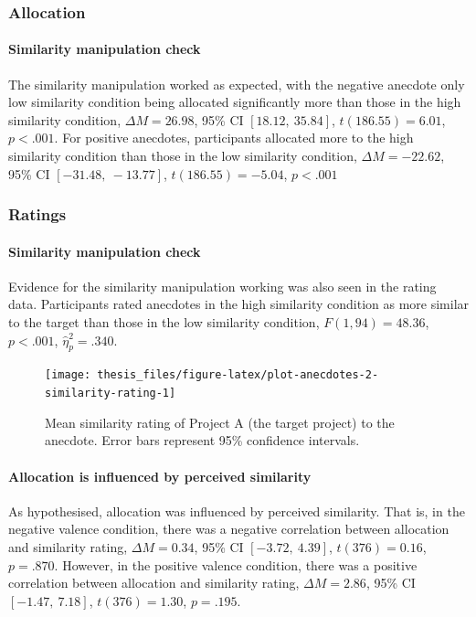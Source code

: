 \documentclass[a4paper, nobind, dvipsnames]{templates/ociamthesis}
\theoremstyle{definition}
\theoremstyle{definition}
\theoremstyle{definition}
\theoremstyle{definition}
\theoremstyle{remark}
\begin{document}
\subsubsection{Allocation}

\paragraph{Similarity manipulation check}

The similarity manipulation worked as expected, with the negative anecdote only
low similarity condition being allocated significantly more than those in the
high similarity condition,
\(\Delta M = 26.98\), 95\% CI \([18.12,~35.84]\), \(t(186.55) = 6.01\), \(p < .001\). For positive
anecdotes, participants allocated more to the high similarity condition than
those in the low similarity condition,
\(\Delta M = -22.62\), 95\% CI \([-31.48,~-13.77]\), \(t(186.55) = -5.04\), \(p < .001\)

\subsubsection{Ratings}

\paragraph{Similarity manipulation check}

Evidence for the similarity manipulation working was also seen in the rating
data. Participants rated anecdotes in the high similarity condition as more
similar to the target than those in the low similarity condition,
\(F(1, 94) = 48.36\), \(p < .001\), \(\hat{\eta}^2_p = .340\).



\begin{figure}
\texttt{[image: thesis\_files/figure-latex/plot-anecdotes-2-similarity-rating-1]} \caption{Mean similarity rating of Project A (the target project) to the anecdote. Error bars represent 95\% confidence intervals.}\label{fig:plot-anecdotes-2-similarity-rating}
\end{figure}

\paragraph{Allocation is influenced by perceived similarity}

As hypothesised, allocation was influenced by perceived similarity. That is, in
the negative valence condition, there was a negative correlation between
allocation and similarity rating,
\(\Delta M = 0.34\), 95\% CI \([-3.72,~4.39]\), \(t(376) = 0.16\), \(p = .870\).
However, in the positive valence condition,
there was a positive correlation between allocation and similarity rating,
\(\Delta M = 2.86\), 95\% CI \([-1.47,~7.18]\), \(t(376) = 1.30\), \(p = .195\).
\end{document}
